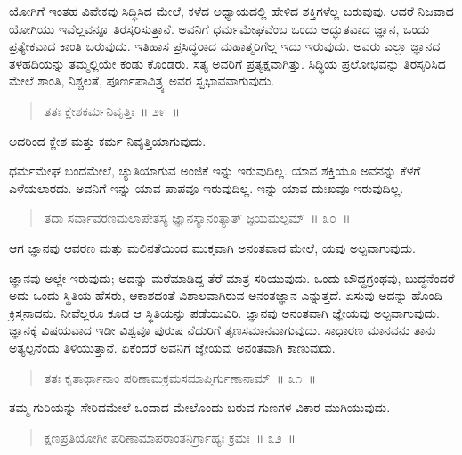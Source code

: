 ಯೋಗಿಗೆ ಇಂತಹ ವಿವೇಕವು ಸಿದ್ಧಿಸಿದ ಮೇಲೆ, ಕಳೆದ ಅಧ್ಯಾಯದಲ್ಲಿ ಹೇಳಿದ ಶಕ್ತಿಗಳೆಲ್ಲ ಬರುವುವು. ಆದರೆ ನಿಜವಾದ ಯೋಗಿಯು ಇವೆಲ್ಲವನ್ನೂ ತಿರಸ್ಕರಿಸುತ್ತಾನೆ. ಅವನಿಗೆ ಧರ್ಮಮೇಘವೆಂಬ ಒಂದು ಅದ್ಭುತವಾದ ಜ್ಞಾನ, ಒಂದು ಪ್ರತ್ಯೇಕವಾದ ಕಾಂತಿ ಬರುವುದು. ಇತಿಹಾಸ ಪ್ರಸಿದ್ಧರಾದ ಮಹಾತ್ಮರಿಗೆಲ್ಲ ಇದು ಇರುವುದು. ಅವರು ಎಲ್ಲಾ ಜ್ಞಾನದ ತಳಹದಿಯನ್ನು ತಮ್ಮಲ್ಲಿಯೇ ಕಂಡು ಕೊಂಡರು. ಸತ್ಯ ಅವರಿಗೆ ಪ್ರತ್ಯಕ್ಷವಾಗಿತ್ತು. ಸಿದ್ಧಿಯ ಪ್ರಲೋಭವನ್ನು ತಿರಸ್ಕರಿಸಿದ ಮೇಲೆ ಶಾಂತಿ, ನಿಶ್ಚಲತೆ, ಪೂರ್ಣಪಾವಿತ್ರ್ಯ ಅವರ ಸ್ವಭಾವವಾಗುವುದು. 

\vspace{-0.3cm}

\begin{verse}
ತತಃ ಕ್ಲೇಶಕರ್ಮನಿವೃತ್ತಿಃ~॥ ೨೯~॥
\end{verse}

\vspace{-0.3cm}

ಅದರಿಂದ ಕ್ಲೇಶ ಮತ್ತು ಕರ್ಮ ನಿವೃತ್ತಿಯಾಗುವುದು. 

ಧರ್ಮಮೇಘ ಬಂದಮೇಲೆ, ಚ್ಯುತಿಯಾಗುವ ಅಂಜಿಕೆ ಇನ್ನು ಇರುವುದಿಲ್ಲ. ಯಾವ ಶಕ್ತಿಯೂ ಅವನನ್ನು ಕೆಳಗೆ ಎಳೆಯಲಾರದು. ಅವನಿಗೆ ಇನ್ನು ಯಾವ ಪಾಪವೂ ಇರುವುದಿಲ್ಲ. ಇನ್ನು ಯಾವ ದುಃಖವೂ ಇರುವುದಿಲ್ಲ. 

\vspace{-0.3cm}

\begin{verse}
ತದಾ ಸರ್ವಾವರಣಮಲಾಪೇತಸ್ಯ ಜ್ಞಾನಸ್ಯಾನಂತ್ಯಾತ್​ ಜ್ಞಯಮಲ್ಪಮ್​~॥ ೩೦~॥
\end{verse}

\vspace{-0.3cm}

ಆಗ ಜ್ಞಾನವು ಆವರಣ ಮತ್ತು ಮಲಿನತೆಯಿಂದ ಮುಕ್ತವಾಗಿ ಅನಂತವಾದ ಮೇಲೆ, ಯವು ಅಲ್ಪವಾಗುವುದು. 

ಜ್ಞಾನವು ಅಲ್ಲೇ ಇರುವುದು; ಅದನ್ನು ಮರೆಮಾಡಿದ್ದ ತೆರೆ ಮಾತ್ರ ಸರಿಯುವುದು. ಒಂದು ಬೌದ್ಧಗ್ರಂಥವು, ಬುದ್ಧನೆಂದರೆ ಅದು ಒಂದು ಸ್ಥಿತಿಯ ಹೆಸರು, ಆಕಾಶದಂತೆ ವಿಶಾಲವಾಗಿರುವ ಅನಂತಜ್ಞಾನ ಎನ್ನುತ್ತದೆ. ಏಸುವು ಅದನ್ನು ಹೊಂದಿ ಕ್ರಿಸ್ತನಾದನು. ನೀವೆಲ್ಲರೂ ಕೂಡ ಆ ಸ್ಥಿತಿಯನ್ನು ಪಡೆಯುವಿರಿ. ಜ್ಞಾನವು ಅನಂತವಾಗಿ ಜ್ಞೇಯವು ಅಲ್ಪವಾಗುವುದು. ಜ್ಞಾನಕ್ಕೆ ವಿಷಯವಾದ ಇಡೀ ವಿಶ್ವವೂ ಪುರುಷ ನೆದುರಿಗೆ ತೃಣಸಮಾನವಾಗುವುದು. ಸಾಧಾರಣ ಮಾನವನು ತಾನು ಅತ್ಯಲ್ಪನೆಂದು ತಿಳಿಯುತ್ತಾನೆ. ಏಕೆಂದರೆ ಅವನಿಗೆ ಜ್ಞೇಯವು ಅನಂತವಾಗಿ ಕಾಣುವುದು.

\begin{verse}
ತತಃ ಕೃತಾರ್ಥಾನಾಂ ಪರಿಣಾಮಕ್ರಮಸಮಾಪ್ತಿರ್ಗುಣಾನಾಮ್​~॥ ೩೧~॥
\end{verse}

ತಮ್ಮ ಗುರಿಯನ್ನು ಸೇರಿದಮೇಲೆ ಒಂದಾದ ಮೇಲೊಂದು ಬರುವ ಗುಣಗಳ ವಿಕಾರ ಮುಗಿಯುವುದು.

\begin{verse}
ಕ್ಷಣಪ್ರತಿಯೋಗೀ ಪರಿಣಾಮಾಪರಾಂತನಿರ್ಗ್ರಾಹ್ಯಃ ಕ್ರಮಃ~॥ ೩೨~॥
\end{verse}


